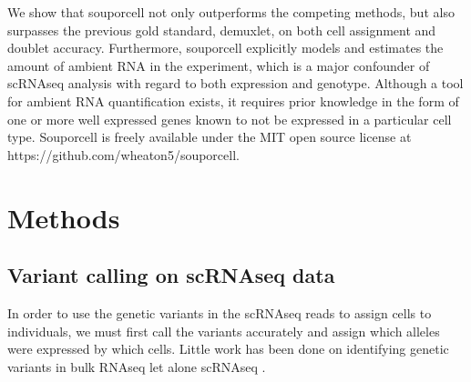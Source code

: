 \par{
We show that souporcell not only outperforms the competing methods, but also surpasses the previous gold standard, demuxlet, on both cell assignment and doublet accuracy. Furthermore, souporcell explicitly models and estimates the amount of ambient RNA in the experiment, which is a major confounder of scRNAseq analysis with regard to both expression and genotype. Although a tool for ambient RNA quantification exists\cite{soupx}, it requires prior knowledge in the form of one or more well expressed genes known to not be expressed in a particular cell type. Souporcell is freely available under the MIT open source license at https://github.com/wheaton5/souporcell.
}


\section{Methods} %
\subsection{Variant calling on scRNAseq data}
In order to use the genetic variants in the scRNAseq reads to assign cells to individuals, we must first call the variants accurately and assign which alleles were expressed by which cells. Little work has been done on identifying genetic variants in bulk RNAseq \cite{RNAvariant}\cite{somaticrna} let alone scRNAseq \cite{vartrix}\cite{cellsnp}. 



